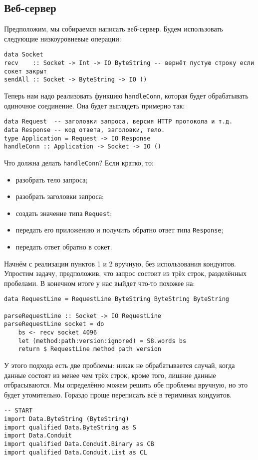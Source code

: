 {\subsection{Веб-сервер}
Предположим, мы собираемся написать веб-сервер. Будем использовать следующие низкоуровневые операции:
\begin{lstlisting}
data Socket
recv    :: Socket -> Int -> IO ByteString -- вернёт пустую строку если сокет закрыт
sendAll :: Socket -> ByteString -> IO ()
\end{lstlisting}
Теперь нам надо реализовать функцию \lstinline'handleConn', которая будет обрабатывать 
одиночное соединение. Она будет выглядеть примерно так:
\begin{lstlisting}
data Request  -- заголовки запроса, версия HTTP протокола и т.д.
data Response -- код ответа, заголовки, тело.
type Application = Request -> IO Response
handleConn :: Application -> Socket -> IO ()
\end{lstlisting}
Что должна делать \lstinline'handleConn'? Если кратко, то:
\begin{itemize}  
\item   разобрать тело запроса;
\item   разобрать заголовки запроса;
\item   создать значение типа \lstinline'Request';
\item   передать его приложению и получить обратно ответ типа \lstinline'Response';
\item   передать ответ обратно в сокет.
\end{itemize}  
Начнём с реализации пунктов 1 и 2 вручную, без использования кондуитов. Упростим задачу, предположив, что 
запрос состоит из трёх строк, разделённых пробелами. 
В конечном итоге у нас выйдет что-то похожее на:
\begin{lstlisting}
data RequestLine = RequestLine ByteString ByteString ByteString

parseRequestLine :: Socket -> IO RequestLine
parseRequestLine socket = do
    bs <- recv socket 4096
    let (method:path:version:ignored) = S8.words bs
    return $ RequestLine method path version
\end{lstlisting}
У этого подхода есть две проблемы: никак не обрабатывается случай, когда данные состоят из менее чем 
трёх строк, кроме того, лишние данные отбрасываются. Мы определённо можем решить обе 
проблемы вручную, но это будет утомительно. Гораздо проще переписать всё 
в териминах кондуитов.
\begin{lstlisting}
-- START
import Data.ByteString (ByteString)
import qualified Data.ByteString as S
import Data.Conduit
import qualified Data.Conduit.Binary as CB
import qualified Data.Conduit.List as CL


\end{lstlisting}}
